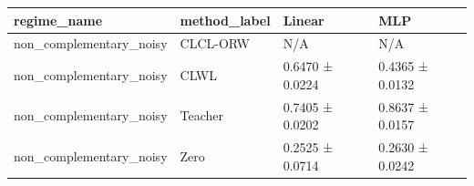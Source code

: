 \begin{tabular}{llll}
\toprule
regime_name & method_label & Linear & MLP \\
\midrule
non_complementary_noisy & CLCL-ORW & N/A & N/A \\
non_complementary_noisy & CLWL & 0.6470 ± 0.0224 & 0.4365 ± 0.0132 \\
non_complementary_noisy & Teacher & 0.7405 ± 0.0202 & 0.8637 ± 0.0157 \\
non_complementary_noisy & Zero & 0.2525 ± 0.0714 & 0.2630 ± 0.0242 \\
\bottomrule
\end{tabular}

